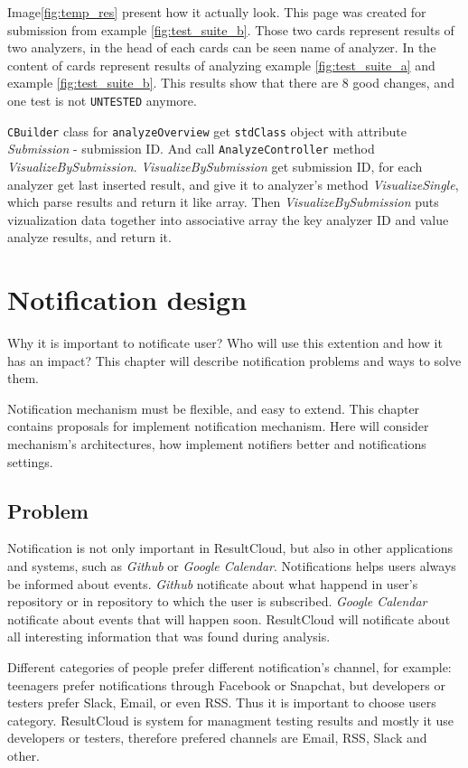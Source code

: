Image\ref{fig:temp_res} present how it actually look. This page was created for submission from example \ref{fig:test_suite_b}. Those two cards represent results of two analyzers, in the head of each cards can be seen name of analyzer. In the content of cards represent results of analyzing example \ref{fig:test_suite_a} and example \ref{fig:test_suite_b}. This results show that there are 8 good changes, and one test is not \texttt{UNTESTED} anymore.  

\texttt{CBuilder} class for \texttt{analyzeOverview} get \texttt{stdClass} object with attribute \emph{Submission} - submission ID. And call \texttt{AnalyzeController} method \emph{VisualizeBySubmission}. \emph{VisualizeBySubmission} get submission ID, for each analyzer get last inserted result, and give it to analyzer's method \emph{VisualizeSingle}, which parse results and return it like array. Then \emph{VisualizeBySubmission} puts vizualization data together into associative array the key analyzer ID and value analyze results, and return it.

\chapter{Notification design}
\label{ch:notification_proposal}

Why it is important to notificate user? Who will use this extention and how it has an impact? This chapter will describe notification problems and ways to solve them.

Notification mechanism must be flexible, and easy to extend. This chapter contains proposals for implement notification mechanism. Here will consider mechanism's architectures, how implement notifiers better and notifications settings. 

\section{Problem}

Notification is not only important in ResultCloud, but also in other applications and systems, such as \emph{Github} or \emph{Google Calendar}. Notifications helps users always be informed about events. \emph{Github} notificate about what happend in user's repository or in repository to which the user is subscribed. \emph{Google Calendar} notificate about events that will happen soon. ResultCloud will notificate about all interesting information that was found during analysis.

Different categories of people prefer different notification's channel, for example: teenagers prefer notifications through Facebook or Snapchat, but developers or testers prefer Slack, Email, or even RSS. Thus it is important to choose users category. ResultCloud is system for managment testing results and mostly it use developers or testers, therefore prefered channels are Email, RSS, Slack and other.

